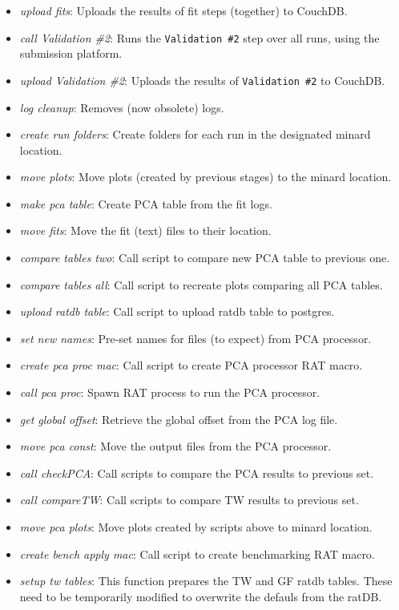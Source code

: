 \documentclass[12pt]{article}
\begin{document}
\begin{itemize}
	\item \textit{upload fits}: Uploads the results of fit steps (together) to CouchDB.
	\item \textit{call Validation \#2}: Runs the \texttt{Validation \#2} step over all runs, using the submission platform. 
	\item \textit{upload Validation \#2}: Uploads the results of \texttt{Validation \#2} to CouchDB.
	\item \textit{log cleanup}: Removes (now obsolete) logs.
	\item \textit{create run folders}: Create folders for each run in the designated minard location. 
	\item \textit{move plots}: Move plots (created by previous stages) to the minard location.
	\item \textit{make pca table}: Create PCA table from the fit logs.
	\item \textit{move fits}: Move the fit (text) files to their location. 
	\item \textit{compare tables two}: Call script to compare new PCA table to previous one.
	\item \textit{compare tables all}: Call script to recreate plots comparing all PCA tables.
	\item \textit{upload ratdb table}: Call script to upload ratdb table to postgres.
	\item \textit{set new names}: Pre-set names for files (to expect) from PCA processor.
	\item \textit{create pca proc mac}: Call script to create PCA processor RAT macro.
	\item \textit{call pca proc}: Spawn RAT process to run the PCA processor.
	\item \textit{get global offset}: Retrieve the global offset from the PCA log file.
	\item \textit{move pca const}: Move the output files from the PCA processor.
	\item \textit{call checkPCA}: Call scripts to compare the PCA results to previous set.
	\item \textit{call compareTW}: Call scripts to compare TW results to previous set.
	\item \textit{move pca plots}: Move plots created by scripts above to minard location.
	\item \textit{create bench apply mac}: Call script to create benchmarking RAT macro.
	\item \textit{setup tw tables}: This function prepares the TW and GF ratdb tables. These need to be temporarily modified to overwrite the defauls from the ratDB.

\end{itemize}
\end{document}
